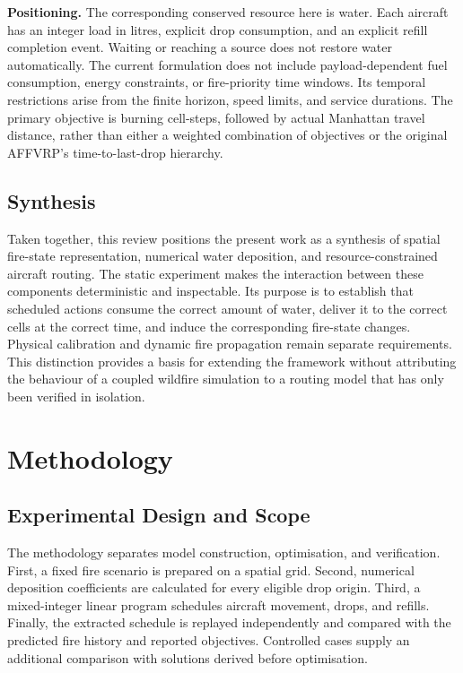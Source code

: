 \textbf{Positioning.} The corresponding conserved resource here is water. Each aircraft has an integer load in litres, explicit drop consumption, and an explicit refill completion event. Waiting or reaching a source does not restore water automatically. The current formulation does not include payload-dependent fuel consumption, energy constraints, or fire-priority time windows. Its temporal restrictions arise from the finite horizon, speed limits, and service durations. The primary objective is burning cell-steps, followed by actual Manhattan travel distance, rather than either a weighted combination of objectives or the original AFFVRP's time-to-last-drop hierarchy.

\section{Synthesis}
\label{sec:lit-synthesis}

Taken together, this review positions the present work as a synthesis of spatial fire-state representation, numerical water deposition, and resource-constrained aircraft routing. The static experiment makes the interaction between these components deterministic and inspectable. Its purpose is to establish that scheduled actions consume the correct amount of water, deliver it to the correct cells at the correct time, and induce the corresponding fire-state changes. Physical calibration and dynamic fire propagation remain separate requirements. This distinction provides a basis for extending the framework without attributing the behaviour of a coupled wildfire simulation to a routing model that has only been verified in isolation.


\chapter{Methodology}
\label{ch:method}

\section{Experimental Design and Scope}
\label{sec:method-scope}

The methodology separates model construction, optimisation, and verification. First, a fixed fire scenario is prepared on a spatial grid. Second, numerical deposition coefficients are calculated for every eligible drop origin. Third, a mixed-integer linear program schedules aircraft movement, drops, and refills. Finally, the extracted schedule is replayed independently and compared with the predicted fire history and reported objectives. Controlled cases supply an additional comparison with solutions derived before optimisation.

